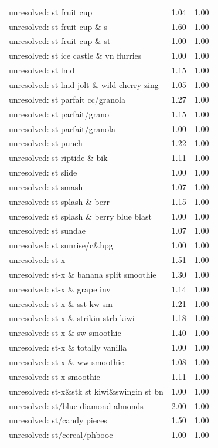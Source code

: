 \begin{table}
\begin{tabular}{lrr}
unresolved: st fruit cup & 1.04 & 1.00 \\
unresolved: st fruit cup \& s & 1.60 & 1.00 \\
unresolved: st fruit cup \& st & 1.00 & 1.00 \\
unresolved: st ice castle \& vn flurries & 1.00 & 1.00 \\
unresolved: st lmd & 1.15 & 1.00 \\
unresolved: st lmd jolt \& wild cherry zing & 1.05 & 1.00 \\
unresolved: st parfait cc/granola & 1.27 & 1.00 \\
unresolved: st parfait/grano & 1.15 & 1.00 \\
unresolved: st parfait/granola & 1.00 & 1.00 \\
unresolved: st punch & 1.22 & 1.00 \\
unresolved: st riptide \& bik & 1.11 & 1.00 \\
unresolved: st slide & 1.00 & 1.00 \\
unresolved: st smash & 1.07 & 1.00 \\
unresolved: st splash \& berr & 1.15 & 1.00 \\
unresolved: st splash \& berry blue blast & 1.00 & 1.00 \\
unresolved: st sundae & 1.07 & 1.00 \\
unresolved: st sunrise/c\&hpg & 1.00 & 1.00 \\
unresolved: st-x & 1.51 & 1.00 \\
unresolved: st-x \& banana split smoothie & 1.30 & 1.00 \\
unresolved: st-x \& grape inv & 1.14 & 1.00 \\
unresolved: st-x \& sst-kw sm & 1.21 & 1.00 \\
unresolved: st-x \& strikin strb kiwi & 1.18 & 1.00 \\
unresolved: st-x \& sw smoothie & 1.40 & 1.00 \\
unresolved: st-x \& totally vanilla & 1.00 & 1.00 \\
unresolved: st-x \& ww smoothie & 1.08 & 1.00 \\
unresolved: st-x smoothie & 1.11 & 1.00 \\
unresolved: st-x\&stk st kiwi\&swingin st bn & 1.00 & 1.00 \\
unresolved: st/blue diamond almonds & 2.00 & 1.00 \\
unresolved: st/candy pieces & 1.50 & 1.00 \\
unresolved: st/cereal/phbooc & 1.00 & 1.00 \\

\end{tabular}
\end{table}
